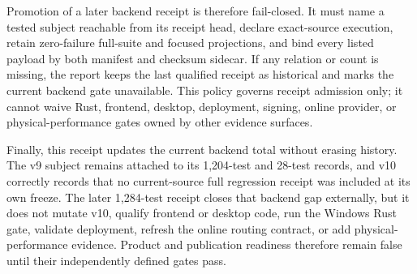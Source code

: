 Promotion of a later backend receipt is therefore fail-closed. It must name a
tested subject reachable from its receipt head, declare exact-source execution,
retain zero-failure full-suite and focused projections, and bind every listed
payload by both manifest and checksum sidecar. If any relation or count is
missing, the report keeps the last qualified receipt as historical and marks
the current backend gate unavailable. This policy governs receipt admission
only; it cannot waive Rust, frontend, desktop, deployment, signing, online
provider, or physical-performance gates owned by other evidence surfaces.

Finally, this receipt updates the current backend total without erasing
history. The v9 subject remains attached to its 1,204-test and 28-test records,
and v10 correctly records that no current-source full regression receipt was
included at its own freeze. The later 1,284-test receipt closes that backend
gap externally, but it does not mutate v10, qualify frontend or desktop code,
run the Windows Rust gate, validate deployment, refresh the online routing
contract, or add physical-performance evidence. Product and publication
readiness therefore remain false until their independently defined gates pass.

\endgroup

\clearpage
\ReportReferences
